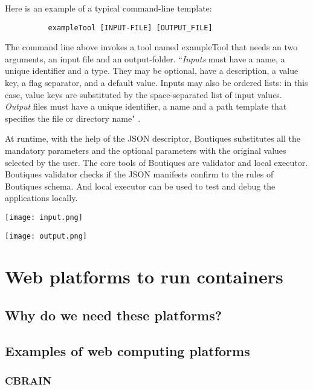 Here is an example of a typical command-line template:

\begin{verbatim}
          exampleTool [INPUT-FILE] [OUTPUT_FILE]
\end{verbatim}

The command line above invokes a tool named exampleTool that needs an two arguments, an input file and an output-folder. ``\textit{Inputs} must have a name, a unique identifier and a type. They may be optional, have a description, a value key, a flag separator, and a default value. Inputs may also be ordered lists: in this case, value keys are substituted by the space-separated list of input values. \textit{Output} files must have a unique identifier, a name and a path template that specifies the file or directory name" \cite{boutiques}.

At runtime, with the help of the JSON descriptor, Boutiques substitutes all the mandatory parameters and the optional parameters with the original values selected by the user. The core tools of Boutiques are validator and local executor. Boutiques validator checks if the JSON manifests confirm to the rules of Boutiques schema. And local executor can be used to test and debug the applications locally.

\begin{center}
\texttt{[image: input.png]}
\label{fig:input}
\end{center}

\begin{center}
\texttt{[image: output.png]}
\label{fig:output}
\end{center}



\section{Web platforms to run containers}
\subsection{Why do we need these platforms?}
\subsection{Examples of web computing platforms}
\subsubsection{CBRAIN}

